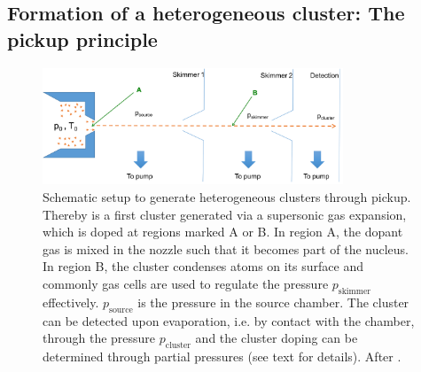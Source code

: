 \subsection{Formation of a heterogeneous cluster: The pickup principle}\label{sec:heterogeneous-cluster}
\begin{figure}
	\centering
		\includegraphics[width=0.80\textwidth]{images/pick-up.png}
	\caption[Schematic of a pickup (gas-)source.]{Schematic setup to generate heterogeneous clusters through pickup. Thereby is a first cluster generated via a supersonic gas expansion, which is doped at regions marked A or B. In region A, the dopant gas is mixed in the nozzle such that it becomes part of the nucleus. In region B, the cluster condenses atoms on its surface and commonly gas cells are used to regulate the pressure $p_{\text{skimmer}}$ effectively. $p_{\text{source}}$ is the pressure in the source chamber. The cluster can be detected upon evaporation, i.e. by contact with the chamber, through the pressure $p_{\text{cluster}}$ and the cluster doping can be determined through partial pressures (see text for details). After \cite{Gough-1985-JChemPhys,Haberland-1994-Springer}.}
	\label{fig:pickupPrinciple}
\end{figure}
